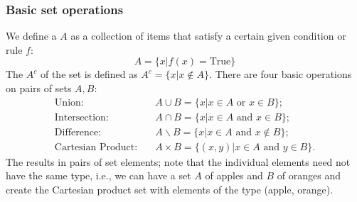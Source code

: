 \subsubsection{Basic set operations} 
We define a  $A$ as a collection of items that satisfy a certain given condition or rule $f$:
\begin{equation}	
	  A = \{x\vert f(x)=\text{True}\}
\end{equation}
The  $A^c$ of the set is defined as $A^c = \{ x\vert x \notin A\}$.  There are four basic operations on pairs of sets $A, B$:
\begin{align}
	\text{Union:} &\quad A\cup B = \{x\vert x\in A \text{ or } x\in B\};\\
	\text{Intersection:} &\quad A\cap B = \{x\vert x\in A \text{ and } x\in B\};\\
	\text{Difference:} &\quad A\backslash B = \{x\vert x\in A \text{ and } x\notin B\};\\
	\text{Cartesian Product:} &\quad A\times B = \{(x,y)\vert x\in A \text{ and } y\in B\}.
\end{align}
The  results in pairs of set elements; note that the individual elements need not have the same type, i.e., we can have a set $A$ of apples and $B$ of oranges and create the Cartesian product set with elements of the type (apple, orange).

